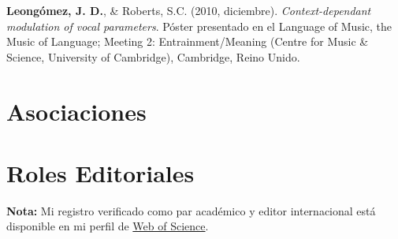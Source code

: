 \documentclass[11pt,a4paper,]{awesome-cv}
\begin{document}
\textbf{Leongómez, J. D.}, \& Roberts, S.C. (2010, diciembre).
\emph{Context-dependant modulation of vocal parameters}. Póster
presentado en el Language of Music, the Music of Language; Meeting 2:
Entrainment/Meaning (Centre for Music \& Science, University of
Cambridge), Cambridge, Reino Unido.

\endgroup

\hypertarget{asociaciones}{%
\section{Asociaciones}\label{asociaciones}}

\begin{cventries}
    \vspace{-4.0mm}
    \vspace{-4.0mm}
    \vspace{-4.0mm}
\end{cventries}

\hypertarget{roles-editoriales}{%
\section{Roles Editoriales}\label{roles-editoriales}}

\begin{footnotesize}
\textbf{Nota:} Mi registro verificado como par académico y editor internacional está disponible en mi perfil de \href{https://www.webofscience.com/wos/author/record/387716}{Web of Science}.
\end{footnotesize}
\end{document}
